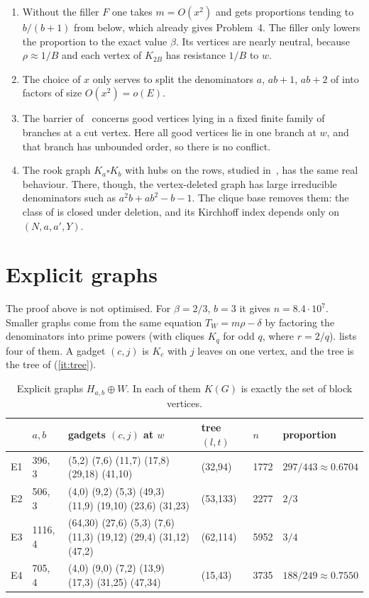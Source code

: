 \documentclass[11pt,a4paper]{report}
\begin{document}
\begin{remark}
\begin{enumerate}
\item Without the filler \(F\) one takes \(m=O(x^2)\) and gets proportions tending to \(b/(b+1)\) from below, which already
gives Problem~4. The filler only lowers the proportion to the exact value \(\beta\). Its vertices are nearly neutral, because
\(\rho\approx1/B\) and each vertex of \(K_{2B}\) has resistance \(1/B\) to \(w\).
\item The choice of \(x\) only serves to split the denominators \(a\), \(ab+1\), \(ab+2\) of  into factors of
size \(O(x^2)=o(E)\).
\item The barrier of~\autocite{ParentResult} concerns good vertices lying in a fixed finite family of branches at a cut vertex. Here
all good vertices lie in one branch at \(w\), and that branch has unbounded order, so there is no conflict.
\item The rook graph \(K_a\square K_b\) with hubs on the rows, studied in~\autocite{ParentResult}, has the same real behaviour.
There, though, the vertex-deleted graph has large irreducible denominators such as \(a^2b+ab^2-b-1\). The clique base
removes them: the class of  is closed under deletion, and its Kirchhoff index depends only on \((N,a,a',Y)\).
\end{enumerate}
\end{remark}

\section{Explicit graphs}\label{sec:examples}

The proof above is not optimised. For \(\beta=2/3\), \(b=3\) it gives \(n=8.4\cdot10^7\). Smaller graphs come from the same
equation \(T_W=m\rho-\delta\) by factoring the denominators into prime powers (with cliques \(K_q\) for odd \(q\), where
\(r=2/q\)).  lists four of them. A gadget \((c,j)\) is \(K_c\) with \(j\) leaves on one vertex, and the
tree is the tree of (\ref{it:tree}).

\begin{table}[ht]
\centering\footnotesize
\begin{tabular}{llp{5.4cm}lll}
 & \(a,b\) & gadgets \((c,j)\) at \(w\) & tree \((l,t)\) & \(n\) & proportion\\ \hline
E1 & 396, 3 & (5,2) (7,6) (11,7) (17,8) (29,18) (41,10) & (32,94) & 1772 & \(297/443\approx0.6704\)\\
E2 & 506, 3 & (4,0) (9,2) (5,3) (49,3) (11,9) (19,10) (23,6) (31,23) & (53,133) & 2277 & \(2/3\)\\
E3 & 1116, 4 & (64,30) (27,6) (5,3) (7,6) (11,3) (19,12) (29,4) (31,12) (47,2) & (62,114) & 5952 & \(3/4\)\\
E4 & 705, 4 & (4,0) (9,0) (7,2) (13,9) (17,3) (31,25) (47,34) & (15,43) & 3735 & \(188/249\approx0.7550\)
\end{tabular}
\caption{Explicit graphs \(H_{a,b}\oplus W\). In each of them \(K(G)\) is exactly the set of block vertices.}
\label{tab:examples}
\end{table}
\end{document}

